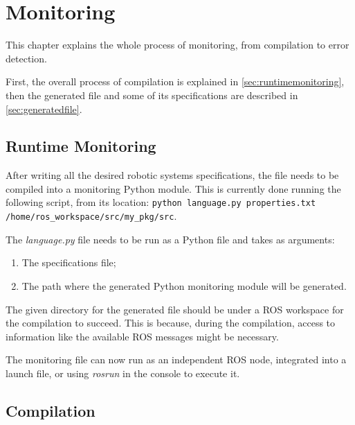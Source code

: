 \chapter{Monitoring}
\label{chap:monitoring}

This chapter explains the whole process of monitoring, from compilation to error detection. 

First, the overall process of compilation is explained in \autoref{sec:runtimemonitoring}, then the generated file and some of its specifications are described in \autoref{sec:generatedfile}.


\section{Runtime Monitoring}
\label{sec:runtimemonitoring}

After writing all the desired robotic systems specifications, the file needs to be compiled into a monitoring Python module. This is currently done running the following script, from its location: \lstinline{python language.py properties.txt /home/ros_workspace/src/my_pkg/src}.

The \textit{language.py} file needs to be run as a Python file and takes as arguments:

\begin{enumerate}
    \item The specifications file;
    \item The path where the generated Python monitoring module will be generated.
\end{enumerate}

The given directory for the generated file should be under a ROS workspace for the compilation to succeed. This is because, during the compilation, access to information like the available ROS messages might be necessary.

The monitoring file can now run as an independent ROS node, integrated into a launch file, or using \textit{rosrun} in the console to execute it.


\section{Compilation} 
\label{sec:generatedfile}

